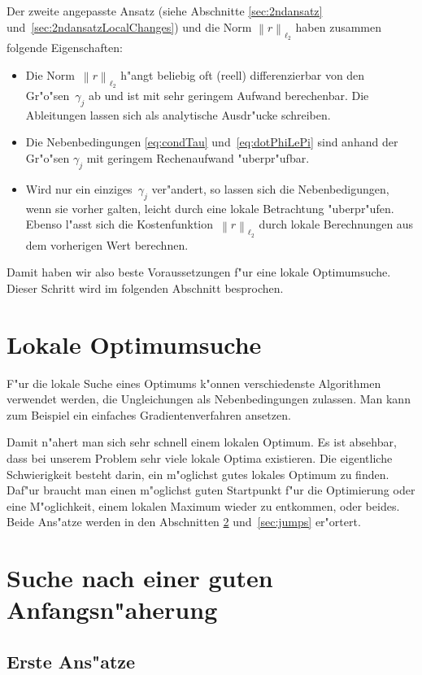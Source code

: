 \documentclass[a4paper]{scrartcl}
\newcommand{\norm}[1]{{\left\lVert#1\right\rVert}}
\begin{document}
Der zweite angepasste Ansatz (siehe Abschnitte \ref{sec:2ndansatz} und~\ref{sec:2ndansatzLocalChanges}) und die Norm $\norm{r}_{\ell_2}$ haben zusammen folgende Eigenschaften:
\begin{itemize}
  \item Die Norm~$\norm{r}_{\ell_2}$ h"angt beliebig oft (reell) differenzierbar von den Gr"o"sen~$\gamma_j$ ab und ist mit sehr geringem Aufwand berechenbar. 
  Die Ableitungen lassen sich als analytische Ausdr"ucke schreiben.
  \item Die Nebenbedingungen \eqref{eq:condTau} und~\eqref{eq:dotPhiLePi} sind anhand der Gr"o"sen $\gamma_j$ mit geringem Rechenaufwand "uberpr"ufbar. 
  \item Wird nur ein einziges~$\gamma_j$ ver"andert, so lassen sich die Nebenbedigungen, wenn sie vorher galten, leicht durch eine lokale Betrachtung "uberpr"ufen. 
  Ebenso l"asst sich die Kostenfunktion~$\norm{r}_{\ell_2}$ durch lokale Berechnungen aus dem vorherigen Wert berechnen. 
\end{itemize}
Damit haben wir also beste Voraussetzungen f"ur eine lokale Optimumsuche. 
Dieser Schritt wird im folgenden Abschnitt besprochen. 


\section{Lokale Optimumsuche} \label{sec:gradients}

F"ur die lokale Suche eines Optimums k"onnen verschiedenste Algorithmen verwendet werden, die Ungleichungen als Nebenbedingungen zulassen. 
Man kann zum Beispiel ein einfaches Gradientenverfahren ansetzen. 

Damit n"ahert man sich sehr schnell einem lokalen Optimum. 
Es ist absehbar, dass bei unserem Problem sehr viele lokale Optima existieren. 
Die eigentliche Schwierigkeit besteht darin, ein m"oglichst gutes lokales Optimum zu finden. 
Daf"ur braucht man einen m"oglichst guten Startpunkt f"ur die Optimierung oder eine M"oglichkeit, einem lokalen Maximum wieder zu entkommen, oder beides. 
Beide Ans"atze werden in den Abschnitten \ref{sec:initialval} und~\ref{sec:jumps} er"ortert. 


\section{Suche nach einer guten Anfangsn"aherung} \label{sec:initialval}

\subsection{Erste Ans"atze}
\end{document}
